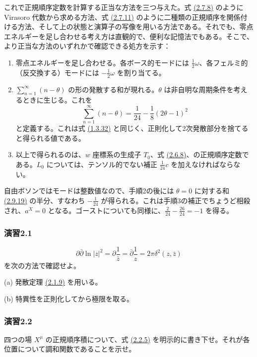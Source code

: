これで正規順序定数を計算する正当な方法を三つ与えた。式 \hyperref[eq:2.7.8]{(2.7.8)} のように Virasoro 代数から求める方法、式 \hyperref[eq:2.7.11]{(2.7.11)} のように二種類の正規順序を関係付ける方法、そして上の状態と演算子の写像を用いる方法である。それでも、零点エネルギーを足し合わせる考え方は直観的で、便利な記憶法でもある。そこで、より正当な方法のいずれかで確認できる処方を示す：
\begin{enumerate}
\item 零点エネルギーを足し合わせる。各ボース的モードには $\frac12\omega$、各フェルミ的（反交換する）モードには $-\frac12\omega$ を割り当てる。
\item $\sum_{n=1}^\infty(n-\theta)$ の形の発散する和が現れる。$\theta$ は非自明な周期条件を考えるときに生じる。これを
\begin{equation}
\sum_{n=1}^\infty(n-\theta)=\frac1{24}-\frac18(2\theta-1)^2
\tag{2.9.19}\label{eq:2.9.19}
\end{equation}
と定義する。これは式 \hyperref[eq:1.3.32]{(1.3.32)} と同じく、正則化して2次発散部分を捨てると得られる値である。
\item 以上で得られるのは、$w$ 座標系の生成子 $T_0$、式 \hyperref[eq:2.6.8]{(2.6.8)}、の正規順序定数である。$L_0$ については、テンソル的でない補正 $\frac1{24}c$ を加えなければならない。
\end{enumerate}
自由ボソンではモードは整数値なので、手順2の後には $\theta=0$ に対する和 \hyperref[eq:2.9.19]{(2.9.19)} の半分、すなわち $-\frac1{24}$ が得られる。これは手順3の補正でちょうど相殺され、$a^X=0$ となる。ゴーストについても同様に、$\frac2{24}-\frac{26}{24}=-1$ を得る。

\label{sec:2.exercises}
\providecommand{\bndnorm}[1]{\mathopen{{}^{\star}_{\star}}#1\mathclose{{}^{\star}_{\star}}}

\subsubsection*{演習2.1}\label{ex:2.1}
\[
\partial\bar\partial\ln|z|^2
=\partial\frac1{\bar z}
=\bar\partial\frac1z
=2\pi\delta^2(z,\bar z)
\]
を次の方法で確認せよ。

\noindent
(a) 発散定理 \hyperref[eq:2.1.9]{(2.1.9)} を用いる。

\noindent
(b) 特異性を正則化してから極限を取る。

\medskip
\subsubsection*{演習2.2}\label{ex:2.2}
四つの場 $X^\mu$ の正規順序積について、式 \hyperref[eq:2.2.5]{(2.2.5)} を明示的に書き下せ。それが各位置について調和関数であることを示せ。

